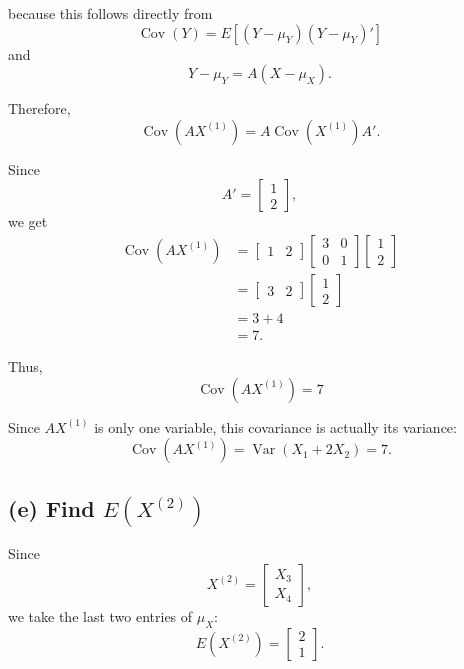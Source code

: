 \documentclass[12pt]{article}
\begin{document}
	because this follows directly from
	\[
	\operatorname{Cov}(Y)
	=
	E[(Y-\mu_Y)(Y-\mu_Y)']
	\]
	and
	\[
	Y-\mu_Y=A(X-\mu_X).
	\]
	
	Therefore,
	\[
	\operatorname{Cov}(AX^{(1)})
	=
	A\operatorname{Cov}(X^{(1)})A'.
	\]
	
	Since
	\[
	A'=
	\begin{bmatrix}
		1\\
		2
	\end{bmatrix},
	\]
	we get
	\[
	\begin{aligned}
		\operatorname{Cov}(AX^{(1)})
		&=
		\begin{bmatrix}
			1&2
		\end{bmatrix}
		\begin{bmatrix}
			3&0\\
			0&1
		\end{bmatrix}
		\begin{bmatrix}
			1\\
			2
		\end{bmatrix}\\
		&=
		\begin{bmatrix}
			3&2
		\end{bmatrix}
		\begin{bmatrix}
			1\\
			2
		\end{bmatrix}\\
		&=3+4\\
		&=7.
	\end{aligned}
	\]
	
	Thus,
	\[
	\boxed{
		\operatorname{Cov}(AX^{(1)})=7
	}
	\]
	
	Since $AX^{(1)}$ is only one variable,
	this covariance is actually its variance:
	\[
	\boxed{
		\operatorname{Cov}(AX^{(1)})
		=
		\operatorname{Var}(X_1+2X_2)=7.
	}
	\]
	
	\subsection*{(e) Find $E(X^{(2)})$}
	
	Since
	\[
	X^{(2)}
	=
	\begin{bmatrix}
		X_3\\
		X_4
	\end{bmatrix},
	\]
	we take the last two entries of $\mu_X$:
	\[
	\boxed{
		E(X^{(2)})
		=
		\begin{bmatrix}
			2\\
			1
		\end{bmatrix}
	}.
	\]
	
\end{document}
